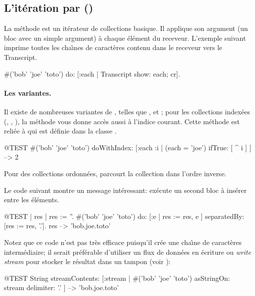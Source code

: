 \documentclass[a4paper,10pt,twoside]{book}
\begin{document}
\subsection{L'it\'eration par ()}
La m\'ethode  est un it\'erateur de collections basique.
Il applique son argument (un bloc avec un simple argument) \`a chaque
\'el\'ement du receveur.
L'exemple suivant imprime toutes les cha\^{\i}nes de caract\`eres
contenu dans le receveur vers le Transcript.

\begin{code}{}
#('bob' 'joe' 'toto') do: [:each | Transcript show: each; cr].
\end{code}

\paragraph{Les variantes.} Il existe de nombreuses variantes de , 
telles que \mbox{,} 
\mbox{} 
et ;
pour les collections index\'ees (, , ), la m\'ethode  
vous donne acc\`es aussi \`a l'indice courant.
Cette m\'ethode est reli\'ee \`a  qui est d\'efinie dans la classe
.

\begin{code}{@TEST}
#('bob' 'joe' 'toto') doWithIndex: [:each :i | (each = 'joe') ifTrue: [ ^ i ] ] --> 2
\end{code}

Pour des collections ordonn\'ees,  parcourt la collection dans l'ordre inverse.

Le code suivant montre un message int\'eressant:
 ex\'ecute un second bloc 
\`a ins\'erer entre les \'el\'ements.
\begin{code}{@TEST | res | }
res := ''.
#('bob' 'joe' 'toto') do: [:e | res := res, e ] separatedBy: [res := res, '.'].
res --> 'bob.joe.toto'
\end{code}
\noindent
Notez que ce code n'est pas tr\`es efficace puisqu'il cr\'ee une cha\^{\i}ne
de caract\`eres interm\'ediaire; il serait pr\'ef\'erable d'utiliser
un flux de donn\'ees en \'ecriture ou \emph{write stream} pour stocker
le r\'esultat dans un tampon (voir ):
\begin{code}{@TEST}
String streamContents: [:stream | #('bob' 'joe' 'toto') asStringOn: stream delimiter: '.' ] --> 'bob.joe.toto'
\end{code}
\end{document}
